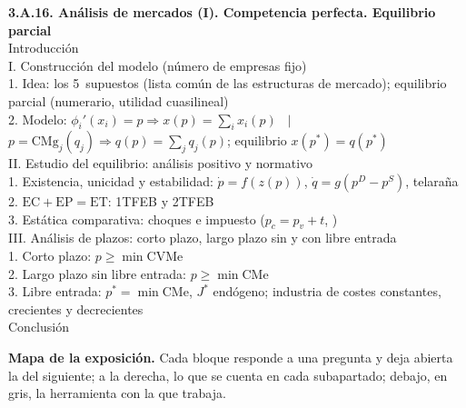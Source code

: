 \documentclass[11pt]{article}
\begin{document}
\begin{esquema}
\textbf{3.A.16. Análisis de mercados (I). Competencia perfecta. Equilibrio parcial}\\[2pt]
Introducción\\
I. Construcción del modelo (número de empresas fijo)\\
\hspace*{1.5em}1. Idea: los 5~supuestos (lista común de las estructuras de mercado); equilibrio parcial (numerario, utilidad cuasilineal)\\
\hspace*{1.5em}2. Modelo: $\phi_i'(x_i)=p\Rightarrow x(p)=\sum_ix_i(p)$ \ $|$ \ $p=\mathrm{CMg}_j(q_j)\Rightarrow q(p)=\sum_jq_j(p)$; equilibrio $x(p^*)=q(p^*)$\\
II. Estudio del equilibrio: análisis positivo y normativo\\
\hspace*{1.5em}1. Existencia, unicidad y estabilidad:  $\dot p=f(z(p))$,  $\dot q=g(p^D-p^S)$, telaraña\\
\hspace*{1.5em}2. $\mathrm{EC}+\mathrm{EP}=\mathrm{ET}$: 1TFEB y 2TFEB\\
\hspace*{1.5em}3. Estática comparativa: choques e impuesto ($p_c=p_v+t$, )\\
III. Análisis de plazos: corto plazo, largo plazo sin y con libre entrada\\
\hspace*{1.5em}1. Corto plazo: $p\geq\min\mathrm{CVMe}$\\
\hspace*{1.5em}2. Largo plazo sin libre entrada: $p\geq\min\mathrm{CMe}$\\
\hspace*{1.5em}3. Libre entrada: $p^*=\min\mathrm{CMe}$, $J^*$ endógeno; industria de costes constantes, crecientes y decrecientes\\
Conclusión
\end{esquema}

\begin{anotaciones}
\textbf{Mapa de la exposición.} Cada bloque responde a una pregunta y deja abierta la del siguiente; a la derecha, lo que se cuenta en cada subapartado; debajo, en gris, la herramienta con la que trabaja.
\begin{infografiacaja}
\caption{Mapa del tema: la pregunta de cada bloque, sus subapartados y el hilo que los une}\label{figu:mapa-tema}
\end{infografiacaja}
\end{anotaciones}
\end{document}
